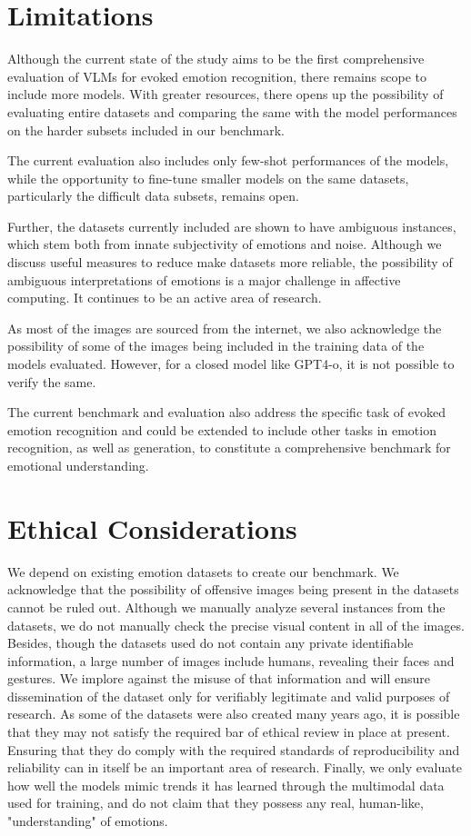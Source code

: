 \section{Limitations}
\label{sec:limitation}

Although the current state of the study aims to be the first comprehensive evaluation of VLMs for evoked emotion recognition, there remains scope to include more models. With greater resources, there opens up the possibility of evaluating entire datasets and comparing the same with the model performances on the harder subsets included in our benchmark. 

The current evaluation also includes only few-shot performances of the models, while the opportunity to fine-tune smaller models on the same datasets, particularly the difficult data subsets, remains open. 

Further, the datasets currently included are shown to have ambiguous instances, which stem both from innate subjectivity of emotions and noise. Although we discuss useful measures to reduce make datasets more reliable, the possibility of ambiguous interpretations of emotions is a major challenge in affective computing. It continues to be an active area of research. 

As most of the images are sourced from the internet, we also acknowledge the possibility of some of the images being included in the training data of the models evaluated. However, for a closed model like GPT4-o, it is not possible to verify the same.

The current benchmark and evaluation also address the specific task of evoked emotion recognition and could be extended to include other tasks in emotion recognition, as well as generation, to constitute a comprehensive benchmark for emotional understanding. 

\section{Ethical Considerations}
\label{ethics}

We depend on existing emotion datasets to create our benchmark. We acknowledge that the possibility of offensive images being present in the datasets cannot be ruled out. Although we manually analyze several instances from the datasets, we do not manually check the precise visual content in all of the images. Besides, though the datasets used do not contain any private identifiable information, a large number of images include humans, revealing their faces and gestures. We implore against the misuse of that information and will ensure dissemination of the dataset only for verifiably legitimate and valid purposes of research. As some of the datasets were also created many years ago, it is possible that they may not satisfy the required bar of ethical review in place at present. Ensuring that they do comply with the required standards of reproducibility and reliability can in itself be an important area of research. Finally, we only evaluate how well the models mimic trends it has learned through the multimodal data used for training, and do not claim that they possess any real, human-like, "understanding" of emotions. 


